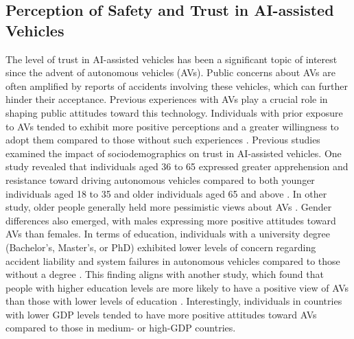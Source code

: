 \subsection{Perception of Safety and Trust in AI-assisted Vehicles}
The level of trust in AI-assisted vehicles has been a significant topic of interest since the advent of autonomous vehicles (AVs). Public concerns about AVs are often amplified by reports of accidents involving these vehicles, which can further hinder their acceptance. Previous experiences with AVs play a crucial role in shaping public attitudes toward this technology. Individuals with prior exposure to AVs tended to exhibit more positive perceptions and a greater willingness to adopt them compared to those without such experiences \cite{othman2021public}. Previous studies examined the impact of sociodemographics on trust in AI-assisted vehicles. One study revealed that individuals aged 36 to 65 expressed greater apprehension and resistance toward driving autonomous vehicles compared to both younger individuals aged 18 to 35 and older individuals aged 65 and above \cite{thomas2020perception}. In other study, older people generally held more pessimistic views about AVs \cite{othman2021public}. Gender differences also emerged, with males expressing more positive attitudes toward AVs than females.
In terms of education, individuals with a university degree (Bachelor's, Master's, or PhD) exhibited lower levels of concern regarding accident liability and system failures in autonomous vehicles compared to those without a degree \cite{thomas2020perception}. This finding aligns with another study, which found that people with higher education levels are more likely to have a positive view of AVs than those with lower levels of education \cite{othman2021public}. Interestingly, individuals in countries with lower GDP levels tended to have more positive attitudes toward AVs compared to those in medium- or high-GDP countries\cite{othman2021public}.


